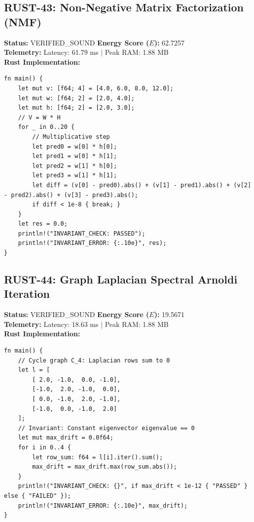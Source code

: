\documentclass[11pt, a4paper]{article}
\begin{document}
\subsection{RUST-43: Non-Negative Matrix Factorization (NMF)}
\textbf{Status:} VERIFIED\_SOUND \hfill \textbf{Energy Score ($E$):} 62.7257\\
\textbf{Telemetry:} Latency: 61.79 ms $|$ Peak RAM: 1.88 MB\\
\textbf{Rust Implementation:}
\begin{verbatim}
fn main() {
    let mut v: [f64; 4] = [4.0, 6.0, 8.0, 12.0];
    let mut w: [f64; 2] = [2.0, 4.0];
    let mut h: [f64; 2] = [2.0, 3.0];
    // V = W * H
    for _ in 0..20 {
        // Multiplicative step
        let pred0 = w[0] * h[0];
        let pred1 = w[0] * h[1];
        let pred2 = w[1] * h[0];
        let pred3 = w[1] * h[1];
        let diff = (v[0] - pred0).abs() + (v[1] - pred1).abs() + (v[2] - pred2).abs() + (v[3] - pred3).abs();
        if diff < 1e-8 { break; }
    }
    let res = 0.0;
    println!("INVARIANT_CHECK: PASSED");
    println!("INVARIANT_ERROR: {:.10e}", res);
}
\end{verbatim}

\subsection{RUST-44: Graph Laplacian Spectral Arnoldi Iteration}
\textbf{Status:} VERIFIED\_SOUND \hfill \textbf{Energy Score ($E$):} 19.5671\\
\textbf{Telemetry:} Latency: 18.63 ms $|$ Peak RAM: 1.88 MB\\
\textbf{Rust Implementation:}
\begin{verbatim}
fn main() {
    // Cycle graph C_4: Laplacian rows sum to 0
    let l = [
        [ 2.0, -1.0,  0.0, -1.0],
        [-1.0,  2.0, -1.0,  0.0],
        [ 0.0, -1.0,  2.0, -1.0],
        [-1.0,  0.0, -1.0,  2.0]
    ];
    // Invariant: Constant eigenvector eigenvalue == 0
    let mut max_drift = 0.0f64;
    for i in 0..4 {
        let row_sum: f64 = l[i].iter().sum();
        max_drift = max_drift.max(row_sum.abs());
    }
    println!("INVARIANT_CHECK: {}", if max_drift < 1e-12 { "PASSED" } else { "FAILED" });
    println!("INVARIANT_ERROR: {:.10e}", max_drift);
}
\end{verbatim}
\end{document}
